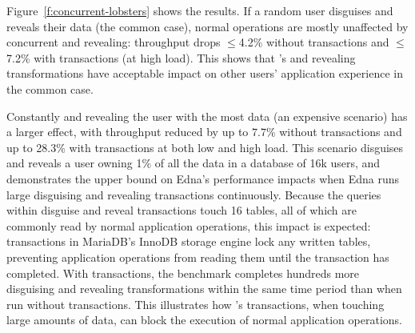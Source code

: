 %

%
Figure~\ref{f:concurrent-lobsters} shows the results.
%
If a random user disguises and reveals their data (the common case), normal
operations are mostly unaffected by concurrent \xxing and revealing: throughput
drops $\le$4.2\% without transactions and $\le$7.2\% with transactions (at high
load).
%
This shows that \sys's \xxing and revealing transformations have acceptable
impact on other users' application experience in the common case.

%
Constantly \xxing and revealing the user with the most data (an expensive 
scenario) has a larger effect, with throughput reduced by up to $7.7$\% without
transactions and up to 28.3\% with transactions at both low and high load.
%
%
%
This scenario disguises and reveals a user owning 1\% of all the data
in a database of 16k users, and demonstrates the upper bound on Edna’s
performance impacts when Edna runs large disguising and revealing transactions
continuously.  Because the queries within disguise and reveal transactions touch
16 tables, all of which are commonly read by normal application operations, this
impact is expected: transactions in MariaDB's InnoDB storage engine lock any
written tables, preventing application operations from reading them until the
transaction has completed.
%
With transactions, the benchmark completes hundreds more disguising and
revealing transformations within the same time period than when run without
transactions. This illustrates how \sys's transactions, when touching large
amounts of data, can block the execution of normal application operations.

